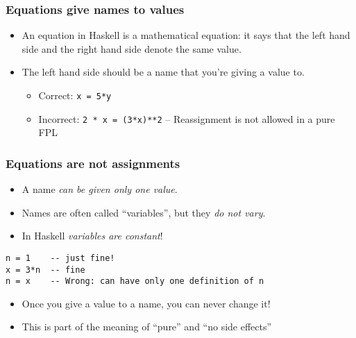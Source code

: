 \documentclass{beamer}
\begin{document}
\begin{frame}
\frametitle{Equations give names to values}

\begin{itemize}
\item An equation in Haskell is a mathematical equation: it says
  that the left hand side and the right hand side denote the same
  value.
\item The left hand side should be a name that you're giving a
  value to.
  \begin{itemize}
  \item Correct: \texttt{x = 5*y}
  \item Incorrect: \texttt{2 * x = (3*x)**2} -- Reassignment is not allowed in a pure FPL
  \end{itemize}
\end{itemize}

\end{frame}

\begin{frame}[fragile]
\frametitle{Equations are not assignments}

\begin{itemize}
\item A name \emph{can be given only one value}.
\item Names are often called ``variables'', but they \emph{do not
    vary}.
\item In Haskell \emph{variables are constant}!
 
\end{itemize}

\begin{verbatim}
n = 1    -- just fine!
x = 3*n  -- fine
n = x    -- Wrong: can have only one definition of n
\end{verbatim}

\begin{itemize}
\item Once you give a value to a name, you can never change it!
\item This is part of the meaning of ``pure'' and
  ``no side effects''
\end{itemize}

\end{frame}

\end{document}
